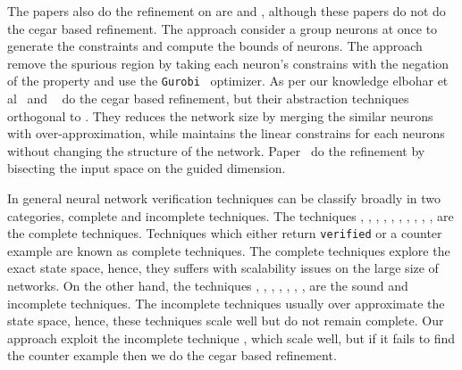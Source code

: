  The papers also do the refinement on \deeppoly{} are \cite{yang2021improving} and \cite{singh2019beyond}, 
 although these papers do not do the cegar based refinement. The approach \cite{singh2019beyond} consider a group neurons
 at once to generate the constraints and compute the bounds of neurons. The approach \cite{yang2021improving} remove the 
 spurious region by taking each neuron's constrains with the negation of the property and use the 
 \texttt{Gurobi}~\cite{gurobioptimizer} optimizer. 
 As per our knowledge elbohar et al~\cite{elboher2020abstraction} and ~\cite{liu2022abstraction} do the cegar based refinement, 
 but their abstraction techniques orthogonal to \deeppoly{}. They reduces the network size by merging the similar 
 neurons with over-approximation, while \deeppoly{} maintains the linear constrains for each neurons without changing the 
 structure of the network. Paper~\cite{lin2020art} do the refinement by bisecting the input space on the guided dimension. 
 
 In general neural network verification techniques can be classify broadly in two categories, 
 complete and incomplete techniques. The techniques \cite{lomuscio2017approach}, \cite{fischetti2018deep},
 \cite{dutta2018output}, \cite{cheng2017maximum}, \cite{katz2017reluplex}, \cite{katz2019marabou}, 
 \cite{ehlers2017formal}, \cite{huang2017safety}, \cite{wang2021beta}, \cite{xu2020fast}, \cite{zhang2022general}
 are the complete techniques. Techniques which either return \texttt{verified} or a counter example 
 are known as complete techniques. 
 The complete techniques explore the exact state space, hence, they suffers with scalability issues on the large 
 size of networks. On the other hand, the techniques \cite{dvijotham2018dual}, \cite{gehr2018ai2}, \cite{singh2018fast},
 \cite{singh2018boosting}, \cite{weng2018towards}, \cite{wong2018provable}, \cite{zhang2018efficient}, \cite{zhang2018efficient}
 are the sound and incomplete techniques. The incomplete techniques usually over approximate the state space, hence, 
 these techniques scale well but do not remain complete. Our approach exploit the incomplete technique \deeppoly{},
 which scale well, but if it fails to find the counter example then we do the cegar based refinement.   